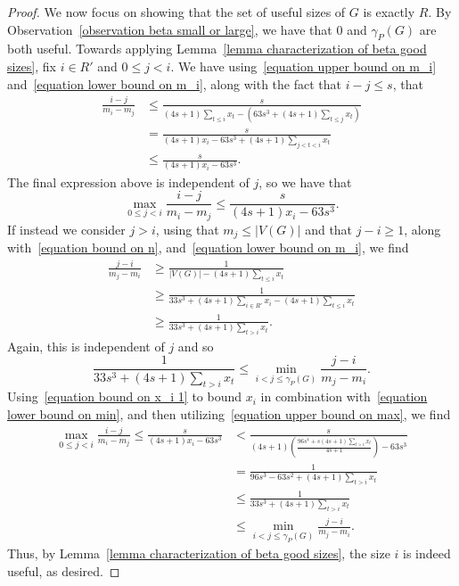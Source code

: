 \documentclass[10pt,a4paper]{amsart}
\begin{document}
\begin{proof}
            We now focus on showing that the set of useful sizes of $G$ is exactly $R$.
            By Observation~\ref{observation beta small or large}, we have that $0$ and $\gamma_P(G)$ are both useful.
            Towards applying Lemma~\ref{lemma characterization of beta good sizes}, fix $i\in R'$ and $0\leq j<i$.
            We have using~\eqref{equation upper bound on m_i} and~\eqref{equation lower bound on m_i}, along with the fact that $i-j\leq s$, that
                \begin{align*}
                    \frac{i-j}{m_i-m_j} &\leq \frac{s}{(4s+1)\displaystyle\sum_{t\leq i}x_{t}-\left(63s^3+ (4s+1)\sum_{t\leq j} x_{t}\right)}\\
                    &= \frac{s}{(4s+1)x_i - 63s^3 + (4s+1) \displaystyle\sum_{j < t < i}x_t}\\
                    &\leq \frac{s}{(4s+1)x_i-63s^3}.
                \end{align*}
            The final expression above is independent of $j$, so we have that
            \begin{equation}\label{equation upper bound on max}
                \max_{0\leq j<i}\frac{i-j}{m_i-m_j}\leq\frac{s}{(4s+1)x_i-63s^3}.
            \end{equation}
            If instead we consider $j>i$, using that $m_j\leq |V(G)|$ and that $j-i\geq 1$, along with~\eqref{equation bound on n}, and~\eqref{equation lower bound on m_i}, we find
            \begin{align*}
                \frac{j-i}{m_j-m_i} &\geq \frac{1}{|V(G)|-(4s+1)\displaystyle\sum_{t\leq i}x_{t}}\\
                &\geq \frac{1}{33s^3 + (4s+1)\displaystyle\sum_{i\in R'}x_i-(4s+1)\displaystyle\sum_{t\leq i}x_{t}}\\
                &\geq \frac{1}{33s^3 +(4s+1)\displaystyle\sum_{t>i}x_{t}}.
            \end{align*}
            Again, this is independent of $j$ and so 
            \begin{equation}\label{equation lower bound on min}
                \frac{1}{33s^3+(4s+1)\displaystyle\sum_{t>i}x_{t}}\leq \min_{i<j\leq \gamma_P(G)}\frac{j-i}{m_j-m_i}.
            \end{equation}
            Using~\eqref{equation bound on x_i 1} to bound $x_i$ in combination with~\eqref{equation lower bound on min}, and then utilizing~\eqref{equation upper bound on max}, we find
            \begin{align*}
                \max_{0\leq j<i}\frac{i-j}{m_i-m_j} \leq\frac{s}{(4s+1)x_i-63s^3}&<\frac{s}{(4s+1)\left( \frac{96s^4+s(4s+1)\displaystyle\sum_{t>i}x_{t} }{4s+1}\right)-63s^3}\\
                &=\frac{1}{96s^3-63s^2+(4s+1)\displaystyle\sum_{t>i}x_{t}}\\   
                &\leq  \frac{1}{33s^3 +(4s+1)\displaystyle\sum_{t>i}x_{t}}  \\
                &\leq \min_{i<j\leq \gamma_P(G)}\frac{j-i}{m_j-m_i}.
                \end{align*}
            Thus, by Lemma~\ref{lemma characterization of beta good sizes}, the size $i$ is indeed useful, as desired.
            

\end{proof}
\end{document}
